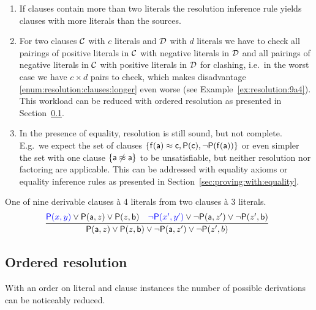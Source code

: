 \begin{enumerate}
	\item\label{enum:resolution:clauses:longer}
	If clauses contain more than two literals the resolution inference rule
	yields clauses with more literals than the sources.

	\item\label{enum:resolution:clauses:multiple}
	For two clauses \( \mathcal{C} \) with \( c \) literals
	and \( \mathcal{D} \) with \( d \) literals
	we have to check all pairings
	of positive literals in \( \mathcal{C} \)
	with negative literals in \( \mathcal{D} \)
	and all pairings of negative literals in \( \mathcal{C} \)
	with positive literals in \( \mathcal{D} \) for clashing,
	i.e.~in the worst case we have \( c\times d \) pairs to check,
	which makes disadvantage \ref{enum:resolution:clauses:longer} even worse
	(see Example~\ref{ex:resolution:9a4}).
	This workload can be reduced with ordered resolution as presented
	in Section~\ref{sec:ordered:resolution}.

	\item In the presence of equality, resolution is still sound, but not complete.
	E.g.~we expect the set of clauses
	\( \{ \mathsf{f}(\mathsf{a}) \approx \mathsf{c}, \mathsf{P}(\mathsf{c}), \lnot\mathsf{P}(\mathsf{f}(\mathsf{a})) \} \)
	or even simpler the set with one clause
	\( \{ \mathsf{a}\not\approx\mathsf{a} \} \)
	to be unsatisfiable, but neither resolution nor factoring
	are applicable. This can be addressed with equality axioms or equality inference rules
	as presented in Section~\ref{sec:proving:with:equality}.
\end{enumerate}

\begin{example}\label{ex:resolution:9a4}
	One of { nine} derivable clauses à 4 literals from two clauses à 3 literals.
	\begin{gather*}
	\infer[]{\mP(\ma,z)\lor\mP(z,\mb)\lor\lnot\mP(\ma,z')\lor\lnot\mP(z',b)}
	{{\colN\mP(x,y)}\lor\mP(\ma,z)\lor\mP(z,\mb) & {\colN\lnot\mP(x',y')}\lor\lnot\mP(\ma,z')\lor\lnot\mP(z',\mb)}
	\end{gather*}
\end{example}

\subsection{Ordered resolution}\label{sec:ordered:resolution}

With an order on literal and clause instances the number of possible derivations can be noticeably reduced.

